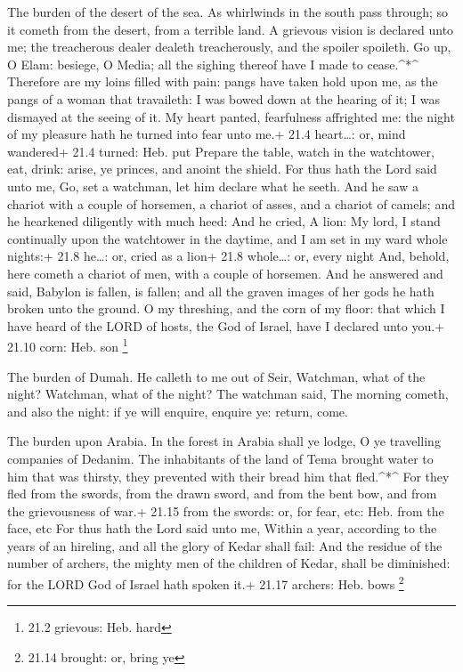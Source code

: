  The burden of the desert of the sea. As whirlwinds in the
south pass through; so it cometh from the desert, from a terrible land.
 A grievous vision is declared unto me; the treacherous
dealer dealeth treacherously, and the spoiler spoileth. Go up, O Elam:
besiege, O Media; all the sighing thereof have I made to cease.\^{}*\^{}
 Therefore are my loins filled with pain: pangs have taken
hold upon me, as the pangs of a woman that travaileth: I was bowed down
at the hearing of it; I was dismayed at the seeing of it. 
My heart panted, fearfulness affrighted me: the night of my pleasure
hath he turned into fear unto me.+ 21.4 heart\ldots: or, mind wandered+
21.4 turned: Heb. put  Prepare the table, watch in the
watchtower, eat, drink: arise, ye princes, and anoint the shield.
 For thus hath the Lord said unto me, Go, set a watchman,
let him declare what he seeth.  And he saw a chariot with a
couple of horsemen, a chariot of asses, and a chariot of camels; and he
hearkened diligently with much heed:  And he cried, A lion:
My lord, I stand continually upon the watchtower in the daytime, and I
am set in my ward whole nights:+ 21.8 he\ldots: or, cried as a lion+
21.8 whole\ldots: or, every night  And, behold, here cometh
a chariot of men, with a couple of horsemen. And he answered and said,
Babylon is fallen, is fallen; and all the graven images of her gods he
hath broken unto the ground.  O my threshing, and the corn
of my floor: that which I have heard of the LORD of hosts, the God of
Israel, have I declared unto you.+ 21.10 corn: Heb. son \footnote{21.2
  grievous: Heb. hard}

 The burden of Dumah. He calleth to me out of Seir,
Watchman, what of the night? Watchman, what of the night? 
The watchman said, The morning cometh, and also the night: if ye will
enquire, enquire ye: return, come.

 The burden upon Arabia. In the forest in Arabia shall ye
lodge, O ye travelling companies of Dedanim.  The
inhabitants of the land of Tema brought water to him that was thirsty,
they prevented with their bread him that fled.\^{}*\^{} 
For they fled from the swords, from the drawn sword, and from the bent
bow, and from the grievousness of war.+ 21.15 from the swords: or, for
fear, etc: Heb. from the face, etc  For thus hath the Lord
said unto me, Within a year, according to the years of an hireling, and
all the glory of Kedar shall fail:  And the residue of the
number of archers, the mighty men of the children of Kedar, shall be
diminished: for the LORD God of Israel hath spoken it.+ 21.17 archers:
Heb. bows \footnote{21.14 brought: or, bring ye}

